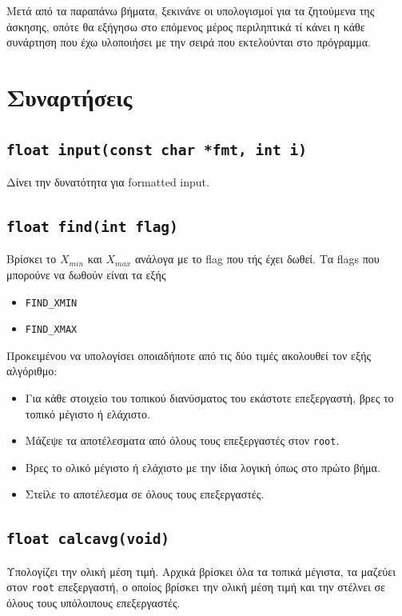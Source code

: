 \documentclass{article}
\begin{document}
Μετά από τα παραπάνω βήματα, ξεκινάνε οι υπολογισμοί για τα ζητούμενα της άσκησης,
οπότε θα εξήγησω στο επόμενος μέρος περιληπτικά τί κάνει η κάθε συνάρτηση που έχω
υλοποιήσει με την σειρά που εκτελούνται στο πρόγραμμα.

\section{Συναρτήσεις}

\subsection{\lstinline{float input(const char *fmt, int i)}}

Δίνει την δυνατότητα για formatted input.

\subsection{\lstinline{float find(int flag)}} \label{find}

Βρίσκει το $X_{min}$ και $X_{max}$ ανάλογα με το flag που
τής έχει δωθεί. Τα flags που μπορούνε να δωθούν είναι τα εξής
\begin{itemize}
        \item \lstinline{FIND_XMIN}
        \item \lstinline{FIND_XMAX}
\end{itemize}
Προκειμένου να υπολογίσει οποιαδήποτε από τις δύο τιμές ακολουθεί τον
εξής αλγόριθμο:
\begin{itemize}
        \item Για κάθε στοιχείο του τοπικού διανύσματος του εκάστοτε
        επεξεργαστή, βρες το τοπικό μέγιστο ή ελάχιστο.
        \item Μάζεψε τα αποτέλεσματα από όλους τους επεξεργαστές στον
        \lstinline{root}.
        \item Βρες το ολικό μέγιστο ή ελάχιστο με την ίδια λογική όπως
        στο πρώτο βήμα.
        \item Στείλε το αποτέλεσμα σε όλους τους επεξεργαστές.
\end{itemize}

\subsection{\lstinline{float calcavg(void)}} \label{calcavg}

Υπολογίζει την ολική μέση τιμή. Αρχικά βρίσκει όλα τα
τοπικά μέγιστα, τα μαζεύει στον \lstinline{root} επεξεργαστή,
ο οποίος βρίσκει την ολική μέση τιμή και την στέλνει σε
όλους τους υπόλοιπους επεξεργαστές.
\end{document}

